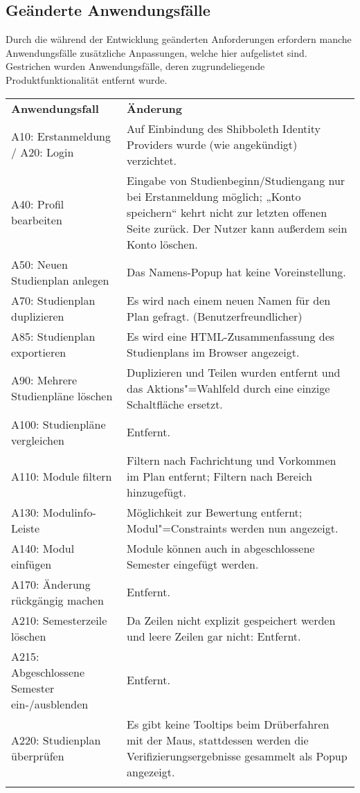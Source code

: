 \FloatBarrier
\subsection{Geänderte Anwendungsfälle}

Durch die während der Entwicklung geänderten Anforderungen erfordern manche Anwendungsfälle zusätzliche Anpassungen, welche hier aufgelistet sind. Gestrichen wurden Anwendungsfälle, deren zugrundeliegende Produktfunktionalität entfernt wurde.

\begin{longtable}{| >{\hspace{0pt}} p{} | >{\hspace{0pt}} p{} |}
	\hline
	\textbf{Anwendungsfall} & \textbf{Änderung} \\ 
	\hhline{|=|=|}  
	\endfirsthead
	\endhead
	A10: Erstanmeldung / \newline A20: Login 
	& Auf Einbindung des Shibboleth Identity Providers wurde (wie angekündigt) verzichtet. \\
	\hline
	A40: Profil bearbeiten
	& Eingabe von Studienbeginn/Studiengang nur bei Erstanmeldung möglich; „Konto speichern“ kehrt nicht zur letzten offenen Seite zurück. Der Nutzer kann außerdem sein Konto löschen. \\
	\hline
	A50: Neuen Studienplan anlegen
	& Das Namens-Popup hat keine Voreinstellung. \\
	\hline
	A70: Studienplan duplizieren
	& Es wird nach einem neuen Namen für den Plan gefragt. (Benutzerfreundlicher) \\
	\hline
	A85: Studienplan exportieren
	& Es wird eine HTML-Zusammenfassung des Studienplans im Browser angezeigt. \\
	\hline
	A90: Mehrere Studienpläne löschen
	& Duplizieren und Teilen wurden entfernt und das Aktions"=Wahlfeld durch eine einzige Schaltfläche ersetzt. \\ 
	\hline
	A100: Studienpläne vergleichen
	& Entfernt. \\
	\hline
	A110: Module filtern
	& Filtern nach Fachrichtung und Vorkommen im Plan entfernt; Filtern nach Bereich hinzugefügt. \\
	\hline
	A130: Modulinfo-Leiste
	& Möglichkeit zur Bewertung entfernt; Modul"=Constraints werden nun angezeigt. \\
	\hline
	A140: Modul einfügen
	& Module können auch in abgeschlossene Semester eingefügt werden. \\
	\hline
	A170: Änderung rückgängig machen
	& Entfernt. \\
	\hline
	A210: Semesterzeile löschen
	& Da Zeilen nicht explizit gespeichert werden und leere Zeilen gar nicht: Entfernt. \\
	\hline
	A215: Abgeschlossene Semester ein-/ausblenden
	& Entfernt. \\
	\hline
	A220: Studienplan überprüfen
	& Es gibt keine Tooltips beim Drüberfahren mit der Maus, stattdessen werden die Verifizierungsergebnisse gesammelt als Popup angezeigt. \\
	\hhline{|=|=|}
\end{longtable}

